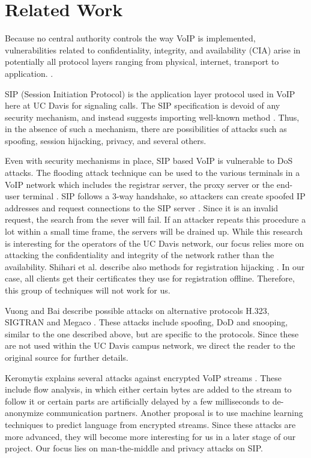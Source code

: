 \section{Related Work}

Because no central authority controls the way VoIP is implemented, vulnerabilities related to confidentiality, integrity, and availability (CIA) arise in potentially all protocol layers ranging from physical, internet, transport to application. \cite{mcgann}. 

SIP (Session Initiation Protocol) is the application layer protocol used in VoIP here at UC Davis for signaling calls. The SIP specification is devoid of any security mechanism, and instead suggests importing well-known method \cite{geneiatakis2006survey}. Thus, in the absence of such a mechanism, there are possibilities of attacks such as spoofing, session hijacking, privacy, and several others.

Even with security mechanisms in place, SIP based VoIP is vulnerable to DoS attacks. The flooding attack technique can be used to the various terminals in a VoIP network which includes the registrar server, the proxy server or the end-user terminal \cite{geneiatakis2006survey}. SIP follows a 3-way handshake, so attackers can create spoofed IP addresses and request connections to the SIP server \cite{srihari}. Since it is an invalid request, the search from the sever will fail. If an attacker repeats this procedure a lot within a small time frame, the servers will be drained up. While this research is interesting for the operators of the UC Davis network, our focus relies more on attacking the confidentiality and integrity of the network rather than the availability. Shihari et al. describe also methods for registration hijacking \cite{srihari}. In our case, all clients get their certificates they use for registration offline. Therefore, this group of techniques will not work for us.

Vuong and Bai describe possible attacks on alternative protocols H.323, SIGTRAN and Megaco \cite{vuong}. These attacks include spoofing, DoD and snooping, similar to the one described above, but are specific to the protocols. Since these are not used within the UC Davis campus network, we direct the reader to the original source for further details.

Keromytis explains several attacks against encrypted VoIP streams \cite{keromytis2012comprehensive}. These include flow analysis, in which either certain bytes are added to the stream to follow it or certain parts are artificially delayed by a few milliseconds to de-anonymize communication partners. Another proposal is to use machine learning techniques to predict language from encrypted streams. Since these attacks are more advanced, they will become more interesting for us in a later stage of our project. Our focus lies on man-the-middle and privacy attacks on SIP.